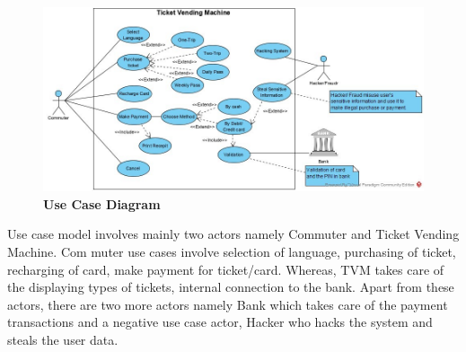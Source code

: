 \documentclass[15pt]{article}
\begin{document}
\begin{figure}[H]
\centering
\includegraphics[scale=0.7]{Use_Case.jpg}
\caption{\Large\bfseries{Use Case Diagram\cite{umlpk}}}
\label{Use Case Diagram:do}
\end{figure}

Use case model involves mainly two actors namely Commuter and Ticket Vending Machine. Com    muter use cases involve selection of language, purchasing of ticket, recharging of card, make payment for ticket/card. Whereas, TVM takes care of the displaying types of tickets, internal connection to the bank. Apart from these actors, there are two more actors namely Bank which takes care of the payment transactions and a negative use case actor, Hacker who hacks the system and steals the user data.

\newpage
\end{document}
